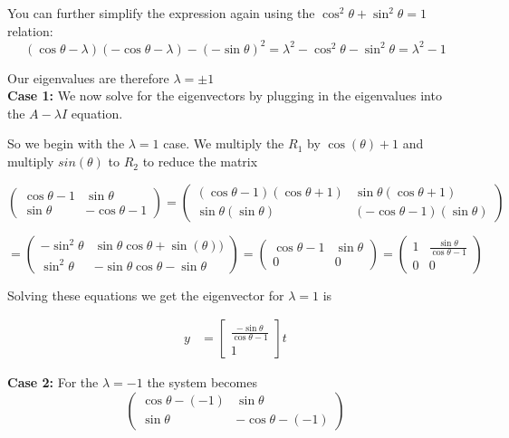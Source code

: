 \documentclass[8pt]{article}
\begin{document}
{{You can further simplify the expression again using the $ \cos ^{2} \theta + \sin ^{2} \theta = 1$ relation:
$$
(\cos \theta - \lambda) (-\cos \theta - \lambda) - (-\sin \theta)^{2} = \lambda ^{2} - \cos ^{2} \theta - \sin ^{2} \theta = \lambda ^{2} -1
$$

Our eigenvalues are therefore $\lambda = \pm 1$ \\

\textbf{Case 1: }We now solve for the eigenvectors by plugging in the eigenvalues into the $A- \lambda I$ equation. 

So we begin with the $\lambda=1$ case. We multiply the $R_1$ by $\cos(\theta) +1$ and multiply $sin(\theta)$ to $R_2$ to reduce the matrix

$$
\begin{pmatrix}
\cos \theta -1 & \sin \theta \\
\sin \theta & -\cos \theta - 1
\end{pmatrix} = 
\begin{pmatrix}
(\cos \theta -1)(\cos \theta +1) & \sin \theta (\cos \theta +1)\\
\sin \theta (\sin \theta) & (-\cos \theta -1)(\sin \theta)
\end{pmatrix} 
$$

$$
= \begin{pmatrix}
-\sin^2 \theta & \sin \theta \cos \theta + \sin(\theta))\\
\sin^2 \theta & -\sin \theta\cos \theta -\sin \theta
\end{pmatrix} =
\begin{pmatrix}
\cos \theta -1 & \sin \theta \\
0 & 0
\end{pmatrix} = 
\begin{pmatrix}
1 & \frac{\sin \theta}{\cos \theta -1} \\
0 & 0
\end{pmatrix}
$$

Solving these equations we get the eigenvector for $\lambda =1$ is 

\begin{align}
    y &= \begin{bmatrix}
           \frac{-\sin \theta }{\cos \theta -1} \\
           1
         \end{bmatrix}t 
\end{align}

\textbf{Case 2: }For the $\lambda =-1$ the system becomes
$$
\begin{pmatrix}
\cos \theta - (-1) & \sin \theta \\
\sin \theta & -\cos \theta -  (-1)
\end{pmatrix} 
$$

}}
\end{document}
